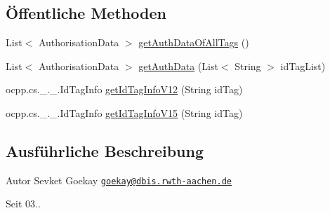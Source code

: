 \subsection*{Öffentliche Methoden}
\begin{DoxyCompactItemize}
\item 
List$<$ Authorisation\-Data $>$ \hyperlink{classde_1_1rwth_1_1idsg_1_1steve_1_1service_1_1_ocpp_tag_service_impl_a64dd6ead6ab37a9017c0484e9a7046f7}{get\-Auth\-Data\-Of\-All\-Tags} ()
\item 
List$<$ Authorisation\-Data $>$ \hyperlink{classde_1_1rwth_1_1idsg_1_1steve_1_1service_1_1_ocpp_tag_service_impl_ae69bf506adc092e4009d870827a2d4b2}{get\-Auth\-Data} (List$<$ String $>$ id\-Tag\-List)
\item 
ocpp.\-cs.\-\_.\-\_.\-Id\-Tag\-Info \hyperlink{classde_1_1rwth_1_1idsg_1_1steve_1_1service_1_1_ocpp_tag_service_impl_ac6bd54d80b55b59271fd42b73ff28f15}{get\-Id\-Tag\-Info\-V12} (String id\-Tag)
\item 
ocpp.\-cs.\-\_.\-\_.\-Id\-Tag\-Info \hyperlink{classde_1_1rwth_1_1idsg_1_1steve_1_1service_1_1_ocpp_tag_service_impl_a565bb2fa82522c27f3aba660b590ccce}{get\-Id\-Tag\-Info\-V15} (String id\-Tag)
\end{DoxyCompactItemize}


\subsection{Ausführliche Beschreibung}
\begin{DoxyAuthor}{Autor}
Sevket Goekay \href{mailto:goekay@dbis.rwth-aachen.de}{\tt goekay@dbis.\-rwth-\/aachen.\-de} 
\end{DoxyAuthor}
\begin{DoxySince}{Seit}
03.. 
\end{DoxySince}


